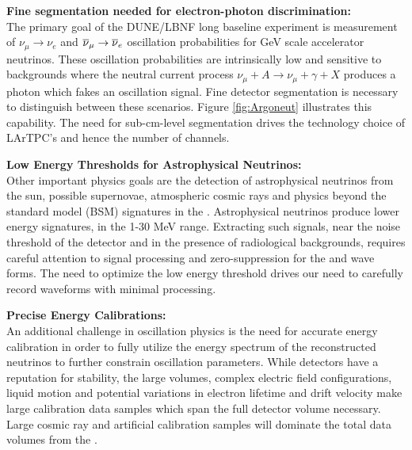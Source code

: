 \documentclass[../main-v1.tex]{subfiles}
\begin{document}
\begin{description}
\item{\bf Fine segmentation needed for electron-photon discrimination: \\}   The primary goal of the DUNE/LBNF long baseline experiment is measurement of $\nu_\mu\rightarrow\nu_e$ and $\overline{\nu}_\mu\rightarrow\overline{\nu}_e$
oscillation probabilities for GeV scale accelerator neutrinos.   These oscillation probabilities are intrinsically low and sensitive to backgrounds where the neutral current process  $\nu_\mu+A\rightarrow\nu_\mu+\gamma+X$
produces a photon which fakes an oscillation signal.  Fine detector segmentation is necessary to distinguish between these scenarios. Figure \ref{fig:Argoneut} illustrates this capability. The need for sub-cm-level segmentation drives the technology choice of LArTPC's and hence the number of channels.   
\item{\bf Low Energy Thresholds for Astrophysical Neutrinos: \\}
Other important physics goals are the detection of astrophysical neutrinos from the sun, possible supernovae, atmospheric cosmic rays and physics beyond the standard model (BSM) signatures in the .  Astrophysical neutrinos produce lower energy signatures, in the 1-30 MeV range. Extracting such signals, near the noise threshold of the detector and in the presence of radiological backgrounds, requires careful attention to signal processing and zero-suppression for the   and  wave forms.  The need to optimize the low energy threshold drives our need to carefully record waveforms with minimal processing. 

\item{\bf Precise Energy Calibrations:\\}
An additional challenge in oscillation physics is the need for accurate energy calibration in order to fully utilize the energy spectrum of the reconstructed neutrinos to further constrain oscillation parameters. While  detectors have a reputation for stability, the large volumes, complex electric field configurations, liquid motion and potential variations in electron lifetime and drift velocity make large calibration data samples which span the full  detector volume necessary.  Large cosmic ray and artificial calibration samples will dominate the total data volumes from the . 


\end{description}
\end{document}
